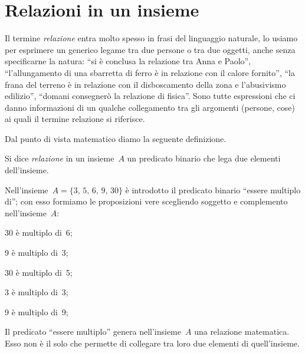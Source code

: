 \ovalbox{\risolvi \ref{ese:\thechapter.1}}

\section{Relazioni in un insieme}

Il termine \emph{relazione} entra molto spesso in frasi del linguaggio naturale, lo usiamo per esprimere un generico legame tra due persone o tra due oggetti,
anche senza specificarne la natura: ``si è conclusa la relazione tra Anna e Paolo'', ``l'allungamento di una sbarretta di ferro è in relazione con il calore fornito'',
``la frana del terreno è in relazione con il disboscamento della zona e l'abusivismo edilizio'', ``domani consegnerò la relazione di fisica''.
Sono tutte espressioni che ci danno informazioni di un qualche collegamento tra gli
argomenti (persone, cose) ai quali il termine relazione si riferisce.

Dal punto di vista matematico diamo la seguente definizione.
\begin{definizione}
Si dice \emph{relazione} in un insieme~$A$ un predicato binario che lega due elementi dell'insieme.
\end{definizione}

\begin{exrig}
 \begin{esempio}
 Nell'insieme~$A = \{3\text{,~}5\text{,~}6\text{,~}9\text{,~}30\}$ è introdotto il predicato binario ``essere multiplo di''; con esso formiamo le proposizioni vere scegliendo soggetto e
 complemento nell'insieme~$A$:

\begin{multicols}{3}
30 è multiplo di~6;

9 è multiplo di~3;



30 è multiplo di~5;

3 è multiplo di~3;



9 è multiplo di~9;

\end{multicols}
Il predicato ``essere multiplo'' genera nell'insieme~$A$ una relazione matematica. Esso non è il
solo che permette di collegare tra loro due elementi di quell'insieme.
\end{esempio}
\end{exrig}

